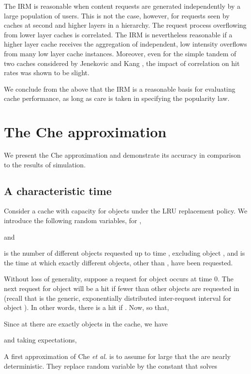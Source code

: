 \documentclass{amsart}
\def\etal{{\em et al. }}
\begin{document}
The IRM is reasonable when content requests are generated independently by a large population of users. This is not the case, however, for requests seen by caches at second and higher layers in a hierarchy. The request process overflowing from lower layer caches is correlated. The IRM is nevertheless reasonable if a higher layer cache receives the aggregation of independent, low intensity overflows from many low layer cache instances. Moreover, even for the simple tandem of two caches considered by Jenekovic and Kang \cite{JK08}, the impact of correlation on hit rates was shown to be slight.

We conclude from the above that the IRM is a reasonable basis for evaluating cache performance, as long as care is taken in specifying the popularity law. 



\section{The Che approximation}
\label{sec:cheapprox}
We present the Che approximation and demonstrate its accuracy in comparison to the results of simulation.

\subsection{A characteristic time}
\label{criticaltime}
Consider a cache with capacity for  objects under the LRU replacement policy. We introduce the following random variables, for , 

and
 
 is the number of different objects requested up to time , excluding object , and  is the time at which exactly  different objects, other than , have been requested. 

Without loss of generality, suppose a request for object  occurs at time 0. The next request for object  will be a hit if fewer than  other objects are requested in  (recall that  is the generic, exponentially distributed inter-request interval  for object ). In other words, there is a hit if . Now,   so that, 


Since at  there are exactly  objects in the cache, we have 

and taking expectations,


A first approximation of Che \etal \cite{CTW02} is to assume for large  that the  are nearly deterministic. They replace random variable  by the constant  that solves
\end{document}
